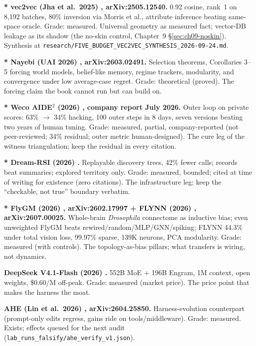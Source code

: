 \textbf{* vec2vec (Jha et al.\ 2025) \cite{jha2025}, arXiv:2505.12540.} 0.92 cosine, rank~1 on 8,192 batches, 80\% inversion via Morris et al., attribute inference beating same-space oracle. Grade: measured. Universal geometry as measured fact; vector-DB leakage as its shadow (the no-skin control, Chapter~9 \S\ref{sec:ch09-noskin}). Synthesis at \texttt{research/FIVE\_BUDGET\_VEC2VEC\_SYNTHESIS\_2026-09-24.md}.

\textbf{* Nayebi (UAI 2026) \cite{nayebi2026}, arXiv:2603.02491.} Selection theorems, Corollaries 3--5 forcing world models, belief-like memory, regime trackers, modularity, and convergence under low average-case regret. Grade: theoretical (proved). The forcing claim the book cannot run but can build on.

\textbf{* Weco AIDE$^{2}$ (2026) \cite{weco2026}, company report July 2026.} Outer loop on private scores: 63\% $\to$ 34\% hacking, 100 outer steps in 8 days, seven versions beating two years of human tuning. Grade: measured, partial, company-reported (not peer-reviewed; 34\% residual; outer metric human-designed). The cure leg of the witness triangulation; keep the residual in every citation.

\textbf{* Dream-RSI (2026) \cite{dreamrsi2026}.} Replayable discovery trees, 42\% fewer calls; records beat summaries; explored territory only. Grade: measured, bounded; cited at time of writing for existence (zero citations). The infrastructure leg; keep the ``checkable, not true'' boundary verbatim.

\textbf{* FlyGM (2026) \cite{flygm2026}, arXiv:2602.17997 + FLYNN (2026) \cite{flynn2026}, arXiv:2607.00025.} Whole-brain \textit{Drosophila} connectome as inductive bias; even unweighted FlyGM beats rewired/random/MLP/GNN/spiking; FLYNN 44.3\% under total vision loss, 99.97\% sparse, 139K neurons, PCA modularity. Grade: measured (with controls). The topology-as-bias pillars; what transfers is wiring, not dynamics.

\textbf{DeepSeek V4.1-Flash (2026) \cite{deepseek2026}.} 552B MoE + 196B Engram, 1M context, open weights, \$0.60/M off-peak. Grade: measured (market price). The price point that makes the harness the moat.

\textbf{AHE (Lin et al.\ 2026) \cite{ahe2026}, arXiv:2604.25850.} Harness-evolution counterpart (prompt-only edits regress, gains ride on tools/middleware). Grade: measured. Exists; effects queued for the next audit (\texttt{lab\_runs\_falsify/ahe\_verify\_v1.json}).

